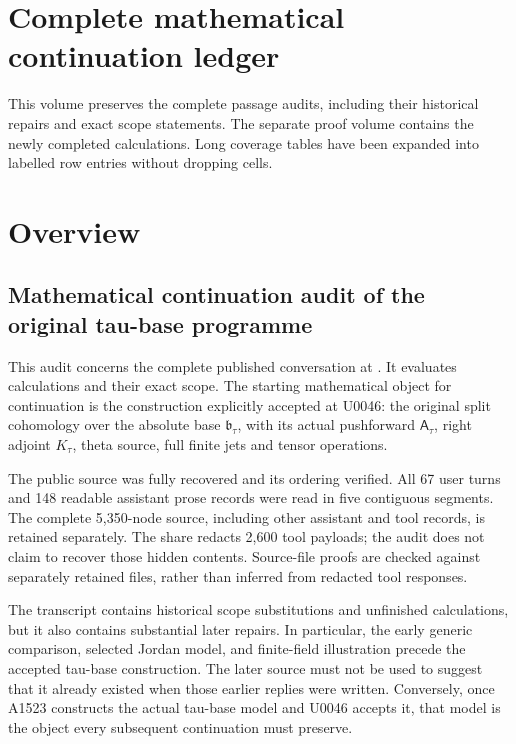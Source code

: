 \section{Complete mathematical continuation
ledger}\label{complete-mathematical-continuation-ledger}

This volume preserves the complete passage audits, including their
historical repairs and exact scope statements. The separate proof volume
contains the newly completed calculations. Long coverage tables have
been expanded into labelled row entries without dropping cells.

\clearpage

\section{Overview}\label{overview}

\subsection{Mathematical continuation audit of the original tau-base
programme}\label{mathematical-continuation-audit-of-the-original-tau-base-programme}

This audit concerns the complete published conversation at
\href{https://chatgpt.com/share/6aa6bc6e-98cc-83eb-9343-e811c26d6631}{\protect{}}.
It evaluates calculations and their exact scope. The starting
mathematical object for continuation is the construction explicitly
accepted at U0046: the original split cohomology over the absolute base
\(\mathfrak b_\tau\), with its actual pushforward \(\mathsf A_\tau\),
right adjoint \(K_\tau\), theta source, full finite jets and tensor
operations.

The public source was fully recovered and its ordering verified. All 67
user turns and 148 readable assistant prose records were read in five
contiguous segments. The complete 5,350-node source, including other
assistant and tool records, is retained separately. The share redacts
2,600 tool payloads; the audit does not claim to recover those hidden
contents. Source-file proofs are checked against separately retained
files, rather than inferred from redacted tool responses.

The transcript contains historical scope substitutions and unfinished
calculations, but it also contains substantial later repairs. In
particular, the early generic comparison, selected Jordan model, and
finite-field illustration precede the accepted tau-base construction.
The later source must not be used to suggest that it already existed
when those earlier replies were written. Conversely, once A1523
constructs the actual tau-base model and U0046 accepts it, that model is
the object every subsequent continuation must preserve.

